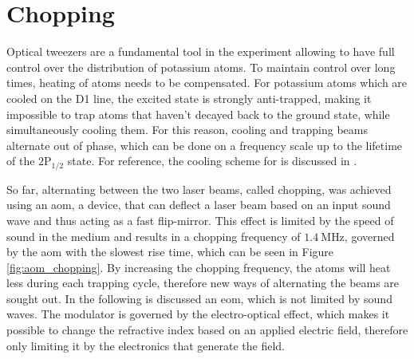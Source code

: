 \chapter{Chopping}



Optical tweezers are a fundamental tool in the experiment allowing to have full control over the distribution of potassium atoms. To maintain control over long times, heating of atoms needs to be compensated. For potassium atoms which are cooled on the D1 line, the excited state is strongly anti-trapped, making it impossible to trap atoms that haven't decayed back to the ground state, while simultaneously cooling them. For this reason, cooling and trapping beams alternate out of phase, which can be done on a frequency scale up to the lifetime of the $2$P$_{1/2}$ state. For reference, the cooling scheme for  is discussed in \cite{Duda2017}.

So far, alternating between the two laser beams, called chopping, was achieved using an \ac{aom}, a device, that can deflect a laser beam based on an input sound wave and thus acting as a fast flip-mirror. This effect is limited by the speed of sound in the medium and results in a chopping frequency of $\SI{1.4}{\mega\hertz}$, governed by the \ac{aom} with the slowest rise time, which can be seen in Figure \ref{fig:aom_chopping}. By increasing the chopping frequency, the atoms will heat less during each trapping cycle, therefore new ways of alternating the beams are sought out. In the following is discussed an \ac{eom}, which is not limited by sound waves. The modulator is governed by the electro-optical effect, which makes it possible to change the refractive index based on an applied electric field, therefore only limiting it by the electronics that generate the field.

